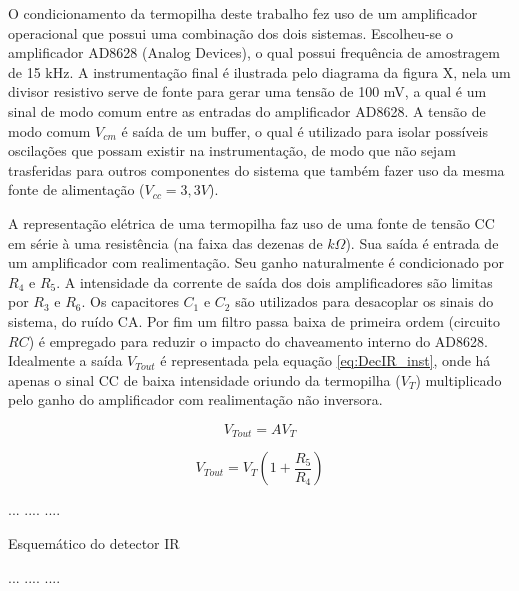 \documentclass[oneside,openright,12pt]{ufsm_2021} %
\begin{document}
                        
            \par O condicionamento da termopilha deste trabalho fez uso de um amplificador operacional que possui uma combinação dos dois sistemas. Escolheu-se o amplificador AD8628 (Analog Devices), o qual possui frequência de amostragem de 15 kHz. A instrumentação final é ilustrada pelo diagrama da figura X, nela um divisor resistivo serve de fonte para gerar uma tensão de 100 mV, a qual é um sinal de modo comum entre as entradas do amplificador AD8628. A tensão de modo comum $V_{cm}$ é saída de um buffer, o qual é utilizado para isolar possíveis oscilações que possam existir na instrumentação, de modo que não sejam trasferidas para outros componentes do sistema que também fazer uso da mesma fonte de alimentação ($V_{cc}=3,3V$).
            \par A representação elétrica de uma termopilha faz uso de uma fonte de tensão CC em série à uma resistência (na faixa das dezenas de $k\Omega$). Sua saída é entrada de um amplificador com realimentação. Seu ganho naturalmente é condicionado por $R_{4}$ e $R_{5}$. A intensidade da corrente de saída dos dois amplificadores são limitas por $R_{3}$ e $R_{6}$. Os capacitores $C_{1}$ e $C_{2}$ são utilizados para desacoplar os sinais do sistema, do ruído CA. Por fim um filtro passa baixa de primeira ordem (circuito $RC$) é empregado para reduzir o impacto do chaveamento interno do AD8628. Idealmente a saída $V_{Tout}$ é representada pela equação \ref{eq:DecIR_inst}, onde há apenas o sinal CC de baixa intensidade oriundo da termopilha ($V_{T}$) multiplicado pelo ganho do amplificador com realimentação não inversora. 

            \begin{equation}
            \label{eq:DecIR_inst1}
                V_{Tout}=AV_{T}
            \end{equation}
            
            \begin{equation}
            \label{eq:DecIR_inst}
                V_{Tout}=V_{T}(1+\frac{R_5}{R_4})
            \end{equation}
            
            \par ...    ....    ....
            \par Esquemático do detector IR
            \par ...    ....    ....
            
\end{document}

